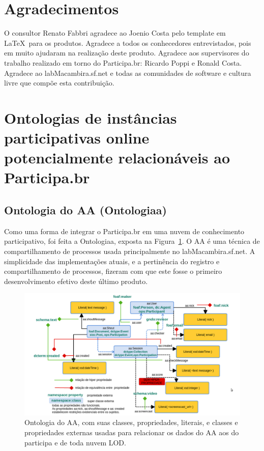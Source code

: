 \documentclass[12pt]{article}
\begin{document}
\section{Agradecimentos}
O consultor Renato Fabbri agradece ao Joenio Costa pelo template em \LaTeX\ para os produtos. Agradece a todos os conhecedores entrevistados, pois em muito ajudaram na realização deste produto. Agradece aos supervisores do trabalho realizado em torno do Participa.br: Ricardo Poppi e Ronald Costa. Agradece ao labMacambira.sf.net e todas as comunidades de software e cultura livre que compõe esta contribuição.
\newpage

\newpage

\newpage
\printindex
\newpage
%
\appendix
\section{Ontologias de instâncias participativas online potencialmente relacionáveis ao Participa.br}
\subsection{Ontologia do AA (Ontologiaa)}\label{ap:aa}
Como uma forma de integrar o Participa.br em uma nuvem de conhecimento participativo, foi feita a Ontologiaa, exposta na Figura~\ref{fig:diaa}. O AA é uma técnica de compartilhamento de processos usada principalmente no labMacambira.sf.net. A simplicidade das implementações atuais, e a pertinência do registro e compartilhamento de processos, fizeram com que este fosse o primeiro desenvolvimento efetivo deste último produto.

\begin{figure}[h!]
  \centering
    \includegraphics[width=\textwidth]{../figs/ontologiaa.png}
  \caption{Ontologia do AA, com suas classes, propriedades, literais, e classes e propriedades externas usadas para relacionar os dados do AA aos do participa e de toda nuvem LOD.}\label{fig:diaa}
\end{figure}
\end{document}
